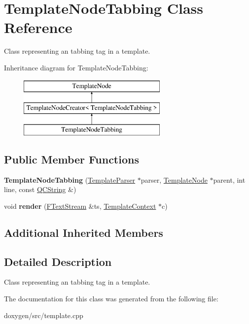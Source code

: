 \hypertarget{class_template_node_tabbing}{}\section{Template\+Node\+Tabbing Class Reference}
\label{class_template_node_tabbing}


Class representing an \textquotesingle{}tabbing\textquotesingle{} tag in a template.  


Inheritance diagram for Template\+Node\+Tabbing\+:\begin{figure}[H]
\begin{center}
\leavevmode
\includegraphics[height=3.000000cm]{class_template_node_tabbing}
\end{center}
\end{figure}
\subsection*{Public Member Functions}
\begin{DoxyCompactItemize}
\item 
\mbox{\label{class_template_node_tabbing_a15b780bcf615ccba43c4a0f38d928280}} 
{\bfseries Template\+Node\+Tabbing} (\mbox{\hyperlink{class_template_parser}{Template\+Parser}} $\ast$parser, \mbox{\hyperlink{class_template_node}{Template\+Node}} $\ast$parent, int line, const \mbox{\hyperlink{class_q_c_string}{Q\+C\+String}} \&)
\item 
\mbox{\label{class_template_node_tabbing_a27930f7435b5fcac5b0dc41858546e56}} 
void {\bfseries render} (\mbox{\hyperlink{class_f_text_stream}{F\+Text\+Stream}} \&ts, \mbox{\hyperlink{class_template_context}{Template\+Context}} $\ast$c)
\end{DoxyCompactItemize}
\subsection*{Additional Inherited Members}


\subsection{Detailed Description}
Class representing an \textquotesingle{}tabbing\textquotesingle{} tag in a template. 

The documentation for this class was generated from the following file\+:\begin{DoxyCompactItemize}
\item 
doxygen/src/template.\+cpp\end{DoxyCompactItemize}
